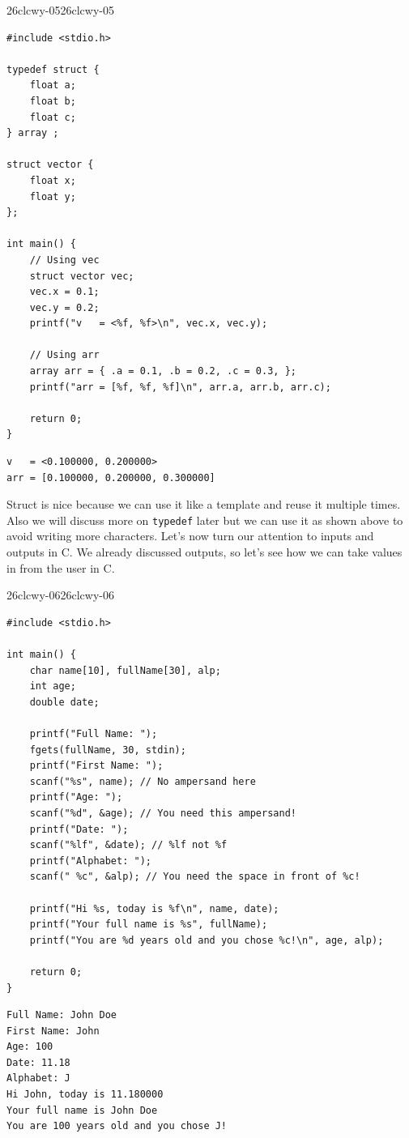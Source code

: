 \documentclass[../../../main.tex]{subfiles}
\begin{document}
\begin{cbox}{26clcwy-05}{26clcwy-05}
\begin{lstlisting}[style=cstyle]
#include <stdio.h>

typedef struct {
    float a;
    float b;
    float c;
} array ;

struct vector {
    float x;
    float y;
};

int main() {
    // Using vec
    struct vector vec;
    vec.x = 0.1;
    vec.y = 0.2;
    printf("v   = <%f, %f>\n", vec.x, vec.y);

    // Using arr
    array arr = { .a = 0.1, .b = 0.2, .c = 0.3, };
    printf("arr = [%f, %f, %f]\n", arr.a, arr.b, arr.c);

    return 0;
}
\end{lstlisting}
\end{cbox}
\begin{outputbox}
\begin{lstlisting}[style=basic]
v   = <0.100000, 0.200000>
arr = [0.100000, 0.200000, 0.300000]
\end{lstlisting}
\end{outputbox}

Struct is nice because we can use it like a template and reuse it
multiple times. Also we will discuss more on \verb|typedef| later
but we can use it as shown above to avoid writing more characters.
Let's now turn our attention to inputs and outputs in C. We already
discussed outputs, so let's see how we can take values in from the
user in C.

\begin{cbox}{26clcwy-06}{26clcwy-06}
\begin{lstlisting}[style=cstyle]
#include <stdio.h>

int main() {
    char name[10], fullName[30], alp;
    int age;
    double date;

    printf("Full Name: ");
    fgets(fullName, 30, stdin);
    printf("First Name: ");
    scanf("%s", name); // No ampersand here
    printf("Age: ");
    scanf("%d", &age); // You need this ampersand!
    printf("Date: ");
    scanf("%lf", &date); // %lf not %f
    printf("Alphabet: ");
    scanf(" %c", &alp); // You need the space in front of %c!

    printf("Hi %s, today is %f\n", name, date);
    printf("Your full name is %s", fullName);
    printf("You are %d years old and you chose %c!\n", age, alp);

    return 0;
}
\end{lstlisting}
\end{cbox}
\begin{outputbox}
\begin{lstlisting}[style=basic]
Full Name: John Doe
First Name: John
Age: 100
Date: 11.18
Alphabet: J
Hi John, today is 11.180000
Your full name is John Doe
You are 100 years old and you chose J!
\end{lstlisting}
\end{outputbox}
\end{document}
